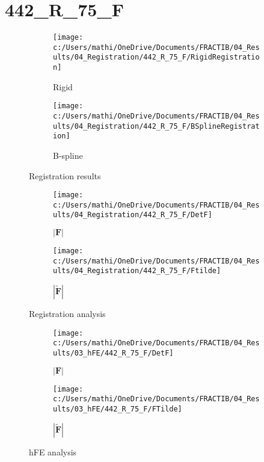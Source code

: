 \documentclass{article}%
\begin{document}
%
\newpage%
\section*{442\_R\_75\_F}%
\label{sec:442R75F}%


\begin{figure}[h!]%
\begin{subfigure}[b]{0.5\linewidth}%
\texttt{[image: c:/Users/mathi/OneDrive/Documents/FRACTIB/04\_Results/04\_Registration/442\_R\_75\_F/RigidRegistration]}%
\caption{Rigid}%
\end{subfigure}%
\begin{subfigure}[b]{0.5\linewidth}%
\texttt{[image: c:/Users/mathi/OneDrive/Documents/FRACTIB/04\_Results/04\_Registration/442\_R\_75\_F/BSplineRegistration]}%
\caption{B{-}spline}%
\end{subfigure}%
\caption{Registration results}%
\end{figure}

%


\begin{figure}[h!]%
\begin{subfigure}[b]{0.5\linewidth}%
\texttt{[image: c:/Users/mathi/OneDrive/Documents/FRACTIB/04\_Results/04\_Registration/442\_R\_75\_F/DetF]}%
\caption{$|\mathbf{F}|$}%
\end{subfigure}%
\begin{subfigure}[b]{0.5\linewidth}%
\texttt{[image: c:/Users/mathi/OneDrive/Documents/FRACTIB/04\_Results/04\_Registration/442\_R\_75\_F/Ftilde]}%
\caption{$|\widetilde{\mathbf{F}}|$}%
\end{subfigure}%
\caption{Registration analysis}%
\end{figure}

%


\begin{figure}[h!]%
\begin{subfigure}[b]{0.5\linewidth}%
\texttt{[image: c:/Users/mathi/OneDrive/Documents/FRACTIB/04\_Results/03\_hFE/442\_R\_75\_F/DetF]}%
\caption{$|\mathbf{F}|$}%
\end{subfigure}%
\begin{subfigure}[b]{0.5\linewidth}%
\texttt{[image: c:/Users/mathi/OneDrive/Documents/FRACTIB/04\_Results/03\_hFE/442\_R\_75\_F/FTilde]}%
\caption{$|\widetilde{\mathbf{F}}|$}%
\end{subfigure}%
\caption{hFE analysis}%
\end{figure}
\end{document}
